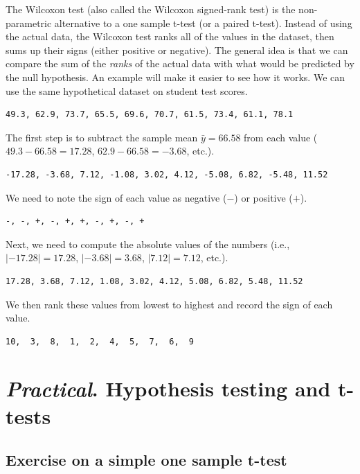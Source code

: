 \documentclass[
]{scrbook}
\begin{document}
The Wilcoxon test (also called the Wilcoxon signed-rank test) is the non-parametric alternative to a one sample t-test (or a paired t-test).
Instead of using the actual data, the Wilcoxon test ranks all of the values in the dataset, then sums up their signs (either positive or negative).
The general idea is that we can compare the sum of the \emph{ranks} of the actual data with what would be predicted by the null hypothesis.
An example will make it easier to see how it works.
We can use the same hypothetical dataset on student test scores.

\begin{verbatim}
49.3, 62.9, 73.7, 65.5, 69.6, 70.7, 61.5, 73.4, 61.1, 78.1
\end{verbatim}

The first step is to subtract the sample mean \(\bar{y} = 66.58\) from each value (\(49.3 - 66.58 = 17.28\), \(62.9 - 66.58 = -3.68\), etc.).

\begin{verbatim}
-17.28, -3.68, 7.12, -1.08, 3.02, 4.12, -5.08, 6.82, -5.48, 11.52
\end{verbatim}

We need to note the sign of each value as negative (\(-\)) or positive (\(+\)).

\begin{verbatim}
-, -, +, -, +, +, -, +, -, +
\end{verbatim}

Next, we need to compute the absolute values of the numbers (i.e., \(|-17.28| = 17.28\), \(|-3.68| = 3.68\), \(|7.12| = 7.12\), etc.).

\begin{verbatim}
17.28, 3.68, 7.12, 1.08, 3.02, 4.12, 5.08, 6.82, 5.48, 11.52
\end{verbatim}

We then rank these values from lowest to highest and record the sign of each value.

\begin{verbatim}
10,  3,  8,  1,  2,  4,  5,  7,  6,  9
\end{verbatim}

\hypertarget{Chapter_22}{%
\chapter{\texorpdfstring{\emph{Practical}. Hypothesis testing and t-tests}{Practical. Hypothesis testing and t-tests}}\label{Chapter_22}}

\hypertarget{exercise-on-a-simple-one-sample-t-test}{%
\section{Exercise on a simple one sample t-test}\label{exercise-on-a-simple-one-sample-t-test}}
\end{document}
